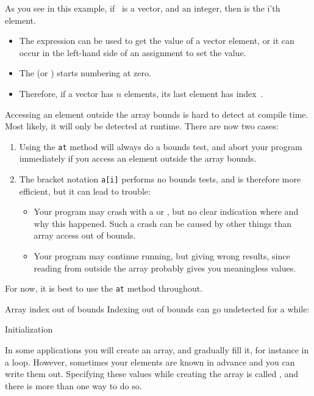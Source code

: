 As you see in this example, if ~is a vector, and  an
integer, then  is the i'th element.
\begin{itemize}
\item The expression  can be used to get the value of a
  vector element, or it can occur in the left-hand side of an
  assignment to set the value.
\item The  (or
  )  starts numbering at zero.
\item Therefore, if a vector has $n$ elements, its last element has
  index~.
\end{itemize}

Accessing an element outside the array bounds is hard to detect at
compile time. Most likely, it will only be detected at runtime.
There are now two cases:
\begin{enumerate}
\item Using the \lstinline{at} method will always do a bounds test,
  and abort your program immediately if you access an element
  outside the array bounds.
\item The bracket notation \lstinline{a[i]} performs no bounds tests,
  and is therefore more efficient, but it can lead to trouble:
  \begin{itemize}
  \item Your program may crash with a 
    or , but no clear indication where and why this happened.
    Such a crash can be caused by other things than array access out of bounds.
  \item Your program may continue running, but  giving wrong results,
    since reading from outside the array probably gives you meaningless values.
  \end{itemize}
\end{enumerate}
For now, it is best to use the \lstinline{at} method throughout.

\begin{block}{Array index out of bounds}
  Indexing out of bounds can go undetected for a while:
  
\end{block}

 {Initialization}

In some applications you will create an array, and gradually fill it,
for instance in a loop. However, sometimes your elements are known in
advance and you can write them out. Specifying these values while
creating the array is called , and
there is more than one way to do so.

